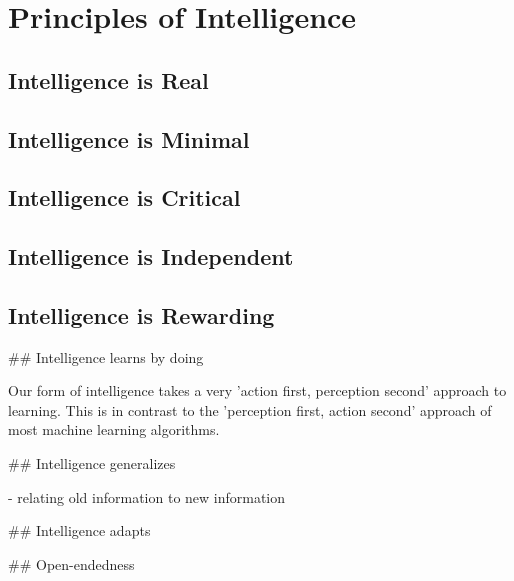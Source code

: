 \section{Principles of Intelligence}

\subsection{Intelligence is Real}

\subsection*{Intelligence is Minimal}

\subsection*{Intelligence is Critical}

\subsection*{Intelligence is Independent}

\subsection*{Intelligence is Rewarding}




## Intelligence learns by doing

Our form of intelligence takes a very 'action first, perception second' approach to learning. This is in contrast to the 'perception first, action second' approach of most machine learning algorithms.


## Intelligence generalizes

- relating old information to new information

## Intelligence adapts


## Open-endedness
